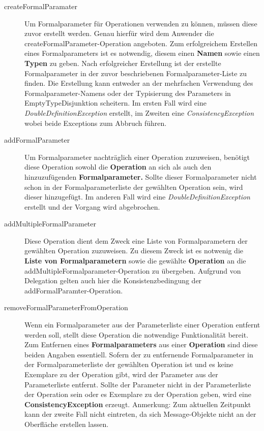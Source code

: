 \begin{description}
\item[createFormalParamater]
Um Formalparameter für Operationen verwenden zu können, müssen diese zuvor erstellt werden. Genau hierfür wird dem Anwender die createFormalParameter-Operation angeboten.
Zum erfolgreichem Erstellen eines Formalparameters ist es notwendig, diesem einen \textbf{Namen} sowie einen \textbf{Typen} zu geben. Nach erfolgreicher Erstellung ist der erstellte Formalparameter in der zuvor beschriebenen Formalparameter-Liste zu finden. Die Erstellung kann entweder an der mehrfachen Verwendung des Formalparameter-Namens oder der Typisierung des Parameters in EmptyTypeDisjunktion scheitern. Im ersten Fall wird eine \emph{DoubleDefinitionException} erstellt, im Zweiten eine \emph{ConsistencyException} wobei beide Exceptions zum Abbruch führen.
\item[addFormalParameter]
Um Formalparameter nachträglich einer Operation zuzuweisen, benötigt diese Operation sowohl die \textbf{Operation} an sich als auch den hinzuzufügenden \textbf{Formalparameter.} Sollte dieser Formalparameter nicht schon in der Formalparameterliste der gewählten Operation sein, wird dieser hinzugefügt. Im anderen Fall wird eine \emph{DoubleDefinitionException} erstellt und der Vorgang wird abgebrochen.
\item[addMultipleFormalParameter]
Diese Operation dient dem Zweck eine Liste von Formalparametern der gewählten Operation zuzuweisen.
Zu diesem Zweck ist es notwenig die \textbf{Liste von Formalparametern} sowie 
die gewählte \textbf{Operation} an die addMultipleFormalparameter-Operation zu übergeben. 
Aufgrund von Delegation gelten auch hier die Konsistenzbedingung der addFormalParamter-Operation. 
\item[removeFormalParameterFromOperation]
Wenn ein Formalparameter aus der Parameterliste einer Operation entfernt werden soll, stellt diese Operation die notwendige Funktionalität bereit. Zum Entfernen eines \textbf{Formalparameters} aus einer \textbf{Operation} sind diese beiden Angaben essentiell. Sofern der zu entfernende Formalparameter in der Formalparameterliste der gewählten Operation ist und es keine Exemplare zu der Operation gibt, wird der Parameter aus der Parameterliste entfernt.
Sollte der Parameter nicht in der Parameterliste der Operation sein oder es Exemplare zu der Operation geben, wird eine \textbf{ConsistencyException} erzeugt. \newline
Anmerkung: Zum aktuellen Zeitpunkt kann der zweite Fall nicht eintreten, da sich Message-Objekte nicht an der Oberfläche erstellen lassen.

\end{description}
